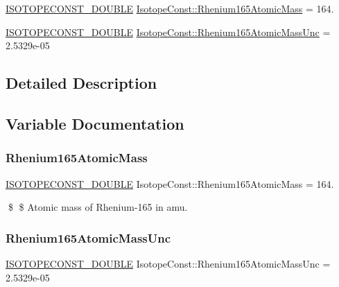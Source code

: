 \begin{DoxyCompactItemize}
\item 
\mbox{\hyperlink{group___isotope_const-_macros_ga8f45a7272ce02c0b4c65c44636ed719a}{I\+S\+O\+T\+O\+P\+E\+C\+O\+N\+S\+T\+\_\+\+D\+O\+U\+B\+LE}} \mbox{\hyperlink{group___isotope_const-_rhenium-_re165_gad4a267aeda5b252f774e16b6a0440b31}{Isotope\+Const\+::\+Rhenium165\+Atomic\+Mass}} = 164.
\item 
\mbox{\hyperlink{group___isotope_const-_macros_ga8f45a7272ce02c0b4c65c44636ed719a}{I\+S\+O\+T\+O\+P\+E\+C\+O\+N\+S\+T\+\_\+\+D\+O\+U\+B\+LE}} \mbox{\hyperlink{group___isotope_const-_rhenium-_re165_ga0c18ed98a6c7b912f485c4879f428052}{Isotope\+Const\+::\+Rhenium165\+Atomic\+Mass\+Unc}} = 2.\+5329e-\/05
\end{DoxyCompactItemize}


\subsection{Detailed Description}


\subsection{Variable Documentation}
\mbox{\label{group___isotope_const-_rhenium-_re165_gad4a267aeda5b252f774e16b6a0440b31}} 
\subsubsection{\texorpdfstring{Rhenium165\+Atomic\+Mass}{Rhenium165AtomicMass}}
{\footnotesize\ttfamily \mbox{\hyperlink{group___isotope_const-_macros_ga8f45a7272ce02c0b4c65c44636ed719a}{I\+S\+O\+T\+O\+P\+E\+C\+O\+N\+S\+T\+\_\+\+D\+O\+U\+B\+LE}} Isotope\+Const\+::\+Rhenium165\+Atomic\+Mass = 164.}

\$ \$ Atomic mass of Rhenium-\/165 in amu. \mbox{\label{group___isotope_const-_rhenium-_re165_ga0c18ed98a6c7b912f485c4879f428052}} 
\subsubsection{\texorpdfstring{Rhenium165\+Atomic\+Mass\+Unc}{Rhenium165AtomicMassUnc}}
{\footnotesize\ttfamily \mbox{\hyperlink{group___isotope_const-_macros_ga8f45a7272ce02c0b4c65c44636ed719a}{I\+S\+O\+T\+O\+P\+E\+C\+O\+N\+S\+T\+\_\+\+D\+O\+U\+B\+LE}} Isotope\+Const\+::\+Rhenium165\+Atomic\+Mass\+Unc = 2.\+5329e-\/05}

